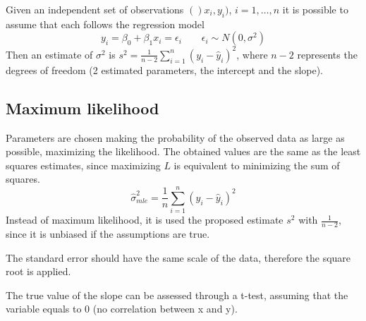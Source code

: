 Given an independent set of observations $()x_i, y_i)$, $i = 1, \dots, n$ it is possible to assume that each follows the regression model
$$y_i = \beta_0 + \beta_1 x_i = \epsilon_i \qquad \epsilon_i \sim N(0, \sigma^2)$$
Then an estimate of $\sigma^2$ is $s^2 = \frac{1}{n-2} \sum_{i=1}^{n}(y_i - \hat{y}_i)^2$, where $n - 2$ represents the degrees of freedom (2 estimated parameters, the intercept and the slope). 

\subsection{Maximum likelihood}
Parameters are chosen making the probability of the observed data as large as possible, maximizing the likelihood. The obtained values are the same as the least squares estimates, since maximizing $L$ is equivalent to minimizing the sum of squares. 
$$\hat{\sigma}^2_{mle} = \frac{1}{n} \sum_{i=1}^{n}(y_i - \hat{y}_i)^2$$
Instead of maximum likelihood, it is used the proposed estimate $s^2$ with $\frac{1}{n-2}$, since it is unbiased if the assumptions are true.

The standard error should have the same scale of the data, therefore the square root is applied. 

The true value of the slope can be assessed through a t-test, assuming that the variable equals to 0 (no correlation between x and y). 


